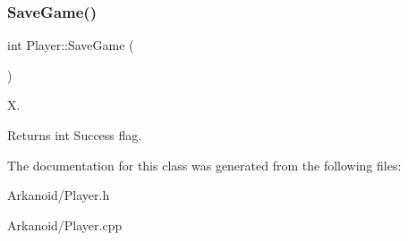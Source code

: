\subsubsection{\texorpdfstring{Save\+Game()}{SaveGame()}}
{\footnotesize\ttfamily int Player\+::\+Save\+Game (\begin{DoxyParamCaption}{ }\end{DoxyParamCaption})}



X. 

\begin{DoxyReturn}{Returns}
int Success flag. 
\end{DoxyReturn}


The documentation for this class was generated from the following files\+:\begin{DoxyCompactItemize}
\item 
Arkanoid/Player.\+h\item 
Arkanoid/Player.\+cpp\end{DoxyCompactItemize}
